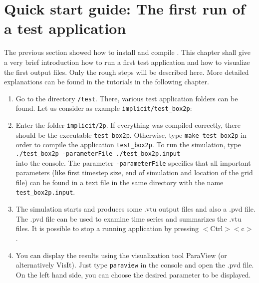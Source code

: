 \section[Quick start guide]{Quick start guide: The first run of a test application}\label{quick-start-guide}

The previous section showed how to install and compile \Dumux. This chapter shall give a very brief introduction how to run a first test application and how to visualize the first output files. Only the rough steps will be described here. More detailed explanations can be found in the tutorials in the following chapter.

\begin{enumerate}
 \item Go to the directory \texttt{/test}. There, various test application folders can be found. Let us consider as example \texttt{implicit/test{\_}box2p}:
 \item Enter the folder \texttt{implicit/2p}. If everything was compiled correctly, there should be the executable \texttt{test{\_}box2p}. Otherwise, type \texttt{make test{\_}box2p} in order to compile the application \texttt{test{\_}box2p}. To run the simulation, type\\ 
 \texttt{./test{\_}box2p -parameterFile ./test\_box2p.input}\\
 into the console. The parameter \texttt{-parameterFile} specifies that all important parameters (like first timestep size, end of simulation and location of the grid file) can be found in a text file in the same directory  with the name \texttt{test\_box2p.input}.
 \item The simulation starts and produces some .vtu output files and also a .pvd file. The .pvd file can be used to examine time series and summarizes the .vtu files. It is possible to stop a running application by pressing $<$Ctrl$><$c$>$.
 \item You can display the results using the visualization tool ParaView (or alternatively VisIt). Just type \texttt{paraview} in the console and open the .pvd file. On the left hand side, you can choose the desired parameter to be displayed.
\end{enumerate}
